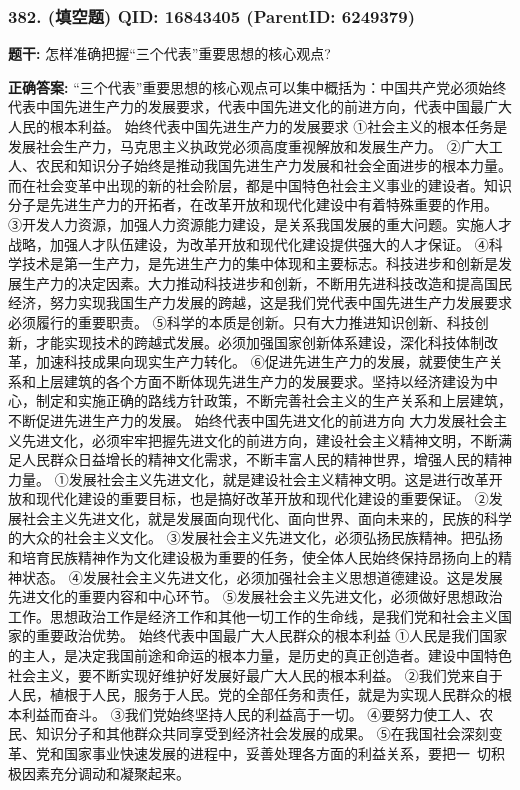 \documentclass[12pt,UTF8]{ctexart}
\begin{document}
\subsubsection*{382. (填空题) \small QID: 16843405 (ParentID: 6249379)}

\textbf{题干:}
怎样准确把握“三个代表”重要思想的核心观点?



\textbf{正确答案:}
“三个代表”重要思想的核心观点可以集中概括为：中国共产党必须始终代表中国先进生产力的发展要求，代表中国先进文化的前进方向，代表中国最广大人民的根本利益。
始终代表中国先进生产力的发展要求
①社会主义的根本任务是发展社会生产力，马克思主义执政党必须高度重视解放和发展生产力。
②广大工人、农民和知识分子始终是推动我国先进生产力发展和社会全面进步的根本力量。而在社会变革中出现的新的社会阶层，都是中国特色社会主义事业的建设者。知识分子是先进生产力的开拓者，在改革开放和现代化建设中有着特殊重要的作用。
③开发人力资源，加强人力资源能力建设，是关系我国发展的重大问题。实施人才战略，加强人才队伍建设，为改革开放和现代化建设提供强大的人才保证。
④科学技术是第一生产力，是先进生产力的集中体现和主要标志。科技进步和创新是发展生产力的决定因素。大力推动科技进步和创新，不断用先进科技改造和提高国民经济，努力实现我国生产力发展的跨越，这是我们党代表中国先进生产力发展要求必须履行的重要职责。
⑤科学的本质是创新。只有大力推进知识创新、科技创新，才能实现技术的跨越式发展。必须加强国家创新体系建设，深化科技体制改革，加速科技成果向现实生产力转化。
⑥促进先进生产力的发展，就要使生产关系和上层建筑的各个方面不断体现先进生产力的发展要求。坚持以经济建设为中心，制定和实施正确的路线方针政策，不断完善社会主义的生产关系和上层建筑，不断促进先进生产力的发展。
始终代表中国先进文化的前进方向
大力发展社会主义先进文化，必须牢牢把握先进文化的前进方向，建设社会主义精神文明，不断满足人民群众日益增长的精神文化需求，不断丰富人民的精神世界，增强人民的精神力量。
①发展社会主义先进文化，就是建设社会主义精神文明。这是进行改革开放和现代化建设的重要目标，也是搞好改革开放和现代化建设的重要保证。
②发展社会主义先进文化，就是发展面向现代化、面向世界、面向未来的，民族的科学的大众的社会主义文化。
③发展社会主义先进文化，必须弘扬民族精神。把弘扬和培育民族精神作为文化建设极为重要的任务，使全体人民始终保持昂扬向上的精神状态。
④发展社会主义先进文化，必须加强社会主义思想道德建设。这是发展先进文化的重要内容和中心环节。
⑤发展社会主义先进文化，必须做好思想政治工作。思想政治工作是经济工作和其他一切工作的生命线，是我们党和社会主义国家的重要政治优势。
始终代表中国最广大人民群众的根本利益
①人民是我们国家的主人，是决定我国前途和命运的根本力量，是历史的真正创造者。建设中国特色社会主义，要不断实现好维护好发展好最广大人民的根本利益。
②我们党来自于人民，植根于人民，服务于人民。党的全部任务和责任，就是为实现人民群众的根本利益而奋斗。
③我们党始终坚持人民的利益高于一切。
④要努力使工人、农民、知识分子和其他群众共同享受到经济社会发展的成果。
⑤在我国社会深刻变革、党和国家事业快速发展的进程中，妥善处理各方面的利益关系，要把一 切积极因素充分调动和凝聚起来。
\end{document}
